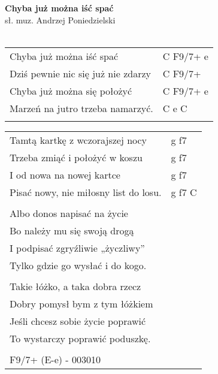 \documentclass[a5paper]{article}
\begin{document}


\noindent
\fontsize{12pt}{15pt}\selectfont
\textbf{Chyba już można iść spać} \\
\fontsize{8pt}{10pt}\selectfont
sł. muz. Andrzej Poniedzielski \\ \\
\fontsize{10pt}{12pt}\selectfont

\begin{tabular}{@{}p{7.50cm}p{3cm}@{}}
\noindent
Chyba już można iść spać & C F9/7+ e \\
Dziś pewnie nic się już nie zdarzy & C F9/7+ \\
Chyba już można się położyć & C F9/7+ e \\
Marzeń na jutro trzeba namarzyć. & C e C \\ \\
\end{tabular}

\noindent
\begin{tabular}{@{}p{8.50cm}p{3cm}@{}}
Tamtą kartkę z wczorajszej nocy & g f7 \\
Trzeba zmiąć i położyć w koszu & g f7 \\
I od nowa na nowej kartce & g f7 \\
Pisać nowy, nie miłosny list do losu. & g f7 C \\ \\
 
Albo donos napisać na życie \\
Bo należy mu się swoją drogą \\
I podpisać zgryźliwie „życzliwy” \\
Tylko gdzie go wysłać i do kogo. \\ \\
 
Takie łóżko, a taka dobra rzecz \\
Dobry pomysł bym z tym łóżkiem \\
Jeśli chcesz sobie życie poprawić \\
To wystarczy poprawić poduszkę. \\ \\

F9/7+ (E-e) - 003010
\end{tabular}
\end{document}
